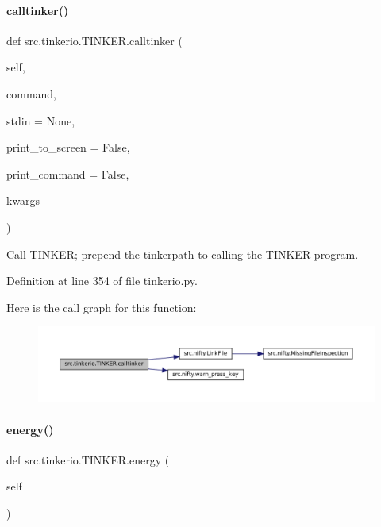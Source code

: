 \paragraph{\texorpdfstring{calltinker()}{calltinker()}}
{\footnotesize\ttfamily def src.\+tinkerio.\+T\+I\+N\+K\+E\+R.\+calltinker (\begin{DoxyParamCaption}\item[{}]{self,  }\item[{}]{command,  }\item[{}]{stdin = {\ttfamily None},  }\item[{}]{print\+\_\+to\+\_\+screen = {\ttfamily False},  }\item[{}]{print\+\_\+command = {\ttfamily False},  }\item[{}]{kwargs }\end{DoxyParamCaption})}



Call \hyperlink{classsrc_1_1tinkerio_1_1TINKER}{T\+I\+N\+K\+ER}; prepend the tinkerpath to calling the \hyperlink{classsrc_1_1tinkerio_1_1TINKER}{T\+I\+N\+K\+ER} program. 



Definition at line 354 of file tinkerio.\+py.

Here is the call graph for this function\+:
\nopagebreak
\begin{figure}[H]
\begin{center}
\leavevmode
\includegraphics[width=350pt]{classsrc_1_1tinkerio_1_1TINKER_ace7003bc50f5ccdc1b2b065fb886b457_cgraph}
\end{center}
\end{figure}
\mbox{\label{classsrc_1_1tinkerio_1_1TINKER_abf1dfcbc000d41955ceed37115c8591b}} 
\paragraph{\texorpdfstring{energy()}{energy()}}
{\footnotesize\ttfamily def src.\+tinkerio.\+T\+I\+N\+K\+E\+R.\+energy (\begin{DoxyParamCaption}\item[{}]{self }\end{DoxyParamCaption})}



